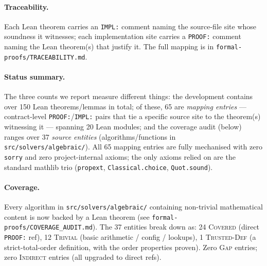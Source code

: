 \documentclass[runningheads]{llncs}
\begin{document}
\begin{enumerate}
\end{enumerate}

\paragraph{Traceability.} Each Lean theorem carries an
\texttt{IMPL:} comment naming the source-file site whose soundness
it witnesses; each implementation site carries a \texttt{PROOF:}
comment naming the Lean theorem(s) that justify it. The full
mapping is in \texttt{formal-proofs/TRACEABILITY.md}.

\paragraph{Status summary.} The three counts we report measure
different things: the development contains over 150 Lean
theorems/lemmas in total; of these, 65 are \emph{mapping entries}
--- contract-level \texttt{PROOF:}/\texttt{IMPL:} pairs that tie a
specific source site to the theorem(s) witnessing it --- spanning
20 Lean modules; and the coverage audit (below) ranges over 37
\emph{source entities} (algorithms/functions in
\texttt{src/solvers/algebraic/}). All 65 mapping entries are
fully mechanised with zero
\texttt{sorry} and zero project-internal axioms; the only
axioms relied on are the standard mathlib trio
(\texttt{propext}, \texttt{Classical.choice},
\texttt{Quot.sound}).

\paragraph{Coverage.} Every algorithm in
\texttt{src/solvers/algebraic/} containing non-trivial
mathematical content is now backed by a Lean theorem (see
\texttt{formal-proofs/COVERAGE\_AUDIT.md}). The 37 entities
break down as: 24 \textsc{Covered} (direct \texttt{PROOF:} ref),
12 \textsc{Trivial} (basic arithmetic / config / lookups), 1
\textsc{Trusted-Def} (a strict-total-order definition, with the
order properties proven). Zero \textsc{Gap} entries; zero
\textsc{Indirect} entries (all upgraded to direct refs).
\end{document}
